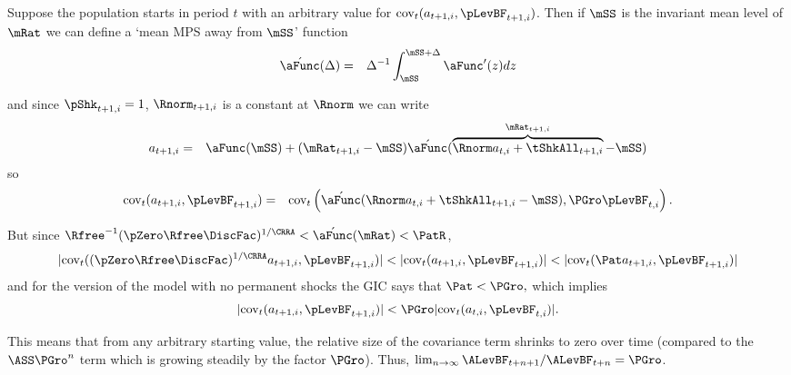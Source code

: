 \documentclass[titlepage]{\econtex}\providecommand{\texname}{BufferStockTheory}%
\begin{document}
Suppose the population starts in period $t$ with an arbitrary value for
 $\mbox{cov}_{t}(a_{t+1,i},\pLevBF_{t+1,i})$. 
  Then if $\mSS$ is the invariant mean
level of $\mRat$ we can define a `mean MPS away from $\mSS$' function
\begin{eqnarray}
 \acute{\aFunc}(\Delta) & = &  \Delta^{-1}\int_{\mSS}^{\mSS+\Delta} \aFunc^{\prime}(z)
 dz \label{eq:checkaFunc} \nonumber
\end{eqnarray}
\begin{comment}
so that
\begin{eqnarray}
 \aFunc(\mRat_{t+1,i}) & = & \aFunc(\Rnorm_{t+1,i} a_{t+1,i}+\tShkAll_{t+1,i})
\\ & = & \aFunc(\mSS) +(\mRat_{t+1,i}-\mSS)\acute{\aFunc}(\Rnorm  a_{t+1,i}+\tShkAll_{t+1,i})
\end{eqnarray}
\end{comment}
and since $\pShk_{t+1,i}=1$, $\Rnorm_{t+1,i}$ is a constant at $\Rnorm$ we can write
\begin{eqnarray}
  a_{t+1,i} & = &
  \aFunc(\mSS)+(\mRat_{t+1,i}-\mSS)\acute{\aFunc}(\overbrace{\Rnorm
    a_{t,i}+\tShkAll_{t+1,i}}^{\mRat_{t+1,i}}-\mSS) \nonumber
\end{eqnarray}
so
\begin{eqnarray}
\mbox{cov}_{t}(a_{t+1,i},\pLevBF_{t+1,i})
&=&\mbox{cov}_{t}\left(\acute{\aFunc}(\Rnorm  a_{t,i}+\tShkAll_{t+1,i}-\mSS)
  ,\PGro   \pLevBF_{t,i}\right). \nonumber
\end{eqnarray}

But since ${\Rfree}^{-1}(\pZero  \Rfree\DiscFac)^{1/\CRRA} < \acute{\aFunc}(\mRat) < \PatR $,
\begin{equation}
  |\mbox{cov}_{t}((\pZero  \Rfree\DiscFac)^{1/\CRRA}a_{t+1,i},\pLevBF_{t+1,i})| <
  |\mbox{cov}_{t}(a_{t+1,i},\pLevBF_{t+1,i})| <
  |\mbox{cov}_{t}({\Pat}a_{t+1,i},\pLevBF_{t+1,i})| \nonumber
\end{equation}
and for the version of the model with no permanent shocks the GIC
says that
${\Pat} < \PGro, $ which implies
\begin{eqnarray}
  |\mbox{cov}_{t}(a_{t+1,i},\pLevBF_{t+1,i})| < \PGro
  |\mbox{cov}_{t}(a_{t,i},\pLevBF_{t,i})|. \nonumber
\end{eqnarray}

This means that from any arbitrary starting value, the relative
size of the covariance term shrinks to zero over time (compared
to the $\ASS \PGro^{n}$ term which is growing steadily
by the factor $\PGro$).  Thus, $\lim_{n \rightarrow \infty} \ALevBF_{t+n+1}/\ALevBF_{t+n} = \PGro$.
\end{document}
